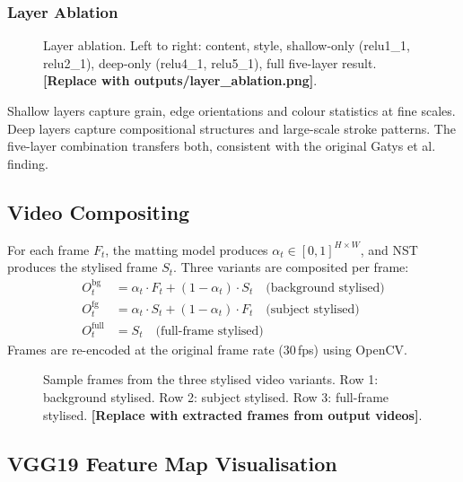 \subsubsection{Layer Ablation}

\begin{figure}[h]
\centering
\fbox{\rule{0pt}{4cm}\rule{\linewidth}{0pt}}
\caption{Layer ablation. Left to right: content, style, shallow-only
(relu1\_1, relu2\_1), deep-only (relu4\_1, relu5\_1), full five-layer result.
\textbf{[Replace with outputs/layer\_ablation.png]}.}
\label{fig:layer_ablation}
\end{figure}

Shallow layers capture grain, edge orientations and colour statistics at fine scales.
Deep layers capture compositional structures and large-scale stroke patterns. The
five-layer combination transfers both, consistent with the original Gatys et al. finding.

\subsection{Video Compositing}

For each frame $F_t$, the matting model produces $\alpha_t \in [0,1]^{H\times W}$,
and NST produces the stylised frame $S_t$. Three variants are composited per frame:
\begin{align}
  O^{\text{bg}}_t   &= \alpha_t \cdot F_t + (1-\alpha_t) \cdot S_t
    \quad \text{(background stylised)} \\
  O^{\text{fg}}_t   &= \alpha_t \cdot S_t + (1-\alpha_t) \cdot F_t
    \quad \text{(subject stylised)} \\
  O^{\text{full}}_t &= S_t
    \quad \text{(full-frame stylised)}
\end{align}
Frames are re-encoded at the original frame rate (30\,fps) using OpenCV.

\begin{figure}[h]
\centering
\fbox{\rule{0pt}{5cm}\rule{\linewidth}{0pt}}
\caption{Sample frames from the three stylised video variants.
Row 1: background stylised. Row 2: subject stylised. Row 3: full-frame stylised.
\textbf{[Replace with extracted frames from output videos]}.}
\label{fig:video_frames}
\end{figure}

\subsection{VGG19 Feature Map Visualisation}

